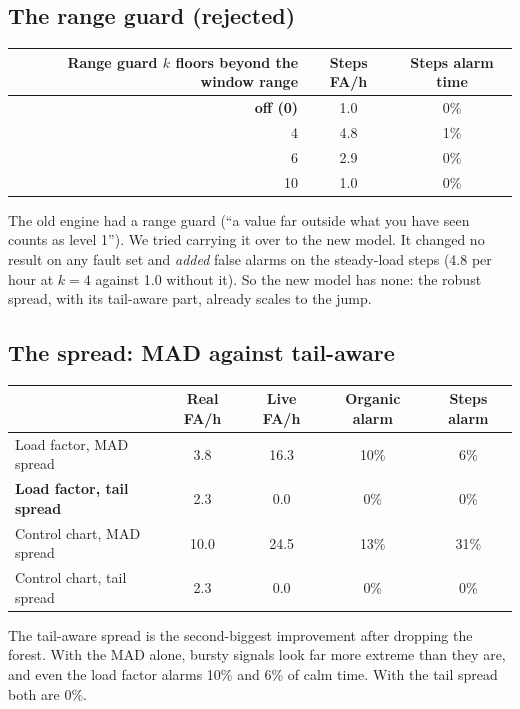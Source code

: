\subsection{The range guard (rejected)}
\begin{center}
\small
\begin{tabular}{rcc}
\toprule
Range guard $k$ floors beyond the window range & Steps FA/h & Steps alarm time\\
\midrule
\textbf{off (0)} & 1.0 & 0\%\\
4 & 4.8 & 1\%\\
6 & 2.9 & 0\%\\
10 & 1.0 & 0\%\\
\bottomrule
\end{tabular}
\end{center}
\begin{simplebox}
The old engine had a range guard (``a value far outside what you have seen counts as level 1''). We tried carrying it over to the new model. It changed no result on any fault set and \emph{added} false alarms on the steady-load steps (4.8 per hour at $k=4$ against 1.0 without it). So the new model has none: the robust spread, with its tail-aware part, already scales to the jump.
\end{simplebox}

\subsection{The spread: MAD against tail-aware}
\begin{center}
\small
\begin{tabular}{lcccc}
\toprule
 & Real FA/h & Live FA/h & Organic alarm & Steps alarm\\
\midrule
Load factor, MAD spread & 3.8 & 16.3 & 10\% & 6\%\\
\textbf{Load factor, tail spread} & 2.3 & 0.0 & 0\% & 0\%\\
Control chart, MAD spread & 10.0 & 24.5 & 13\% & 31\%\\
Control chart, tail spread & 2.3 & 0.0 & 0\% & 0\%\\
\bottomrule
\end{tabular}
\end{center}
\begin{simplebox}
The tail-aware spread is the second-biggest improvement after dropping the forest. With the MAD alone, bursty signals look far more extreme than they are, and even the load factor alarms 10\% and 6\% of calm time. With the tail spread both are 0\%.
\end{simplebox}

